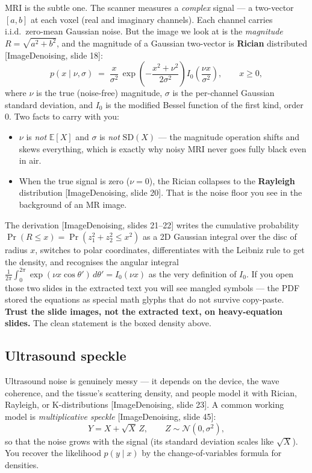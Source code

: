\documentclass[11pt]{article}
\newcommand{\E}{\mathbb{E}}
\newcommand{\deck}[1]{\textsf{\small[#1]}}
\begin{document}
MRI is the subtle one. The scanner measures a \emph{complex} signal --- a
two-vector $[a,b]$ at each voxel (real and imaginary channels). Each channel
carries i.i.d.\ zero-mean Gaussian noise. But the image we look at is the
\emph{magnitude} $R=\sqrt{a^2+b^2}$, and the magnitude of a Gaussian two-vector
is \textbf{Rician} distributed \deck{ImageDenoising, slide 18}:
\[
p(x \mid \nu,\sigma) \;=\;
   \frac{x}{\sigma^2}\,
   \exp\!\left(-\frac{x^2+\nu^2}{2\sigma^2}\right)
   I_0\!\left(\frac{\nu x}{\sigma^2}\right), \qquad x \ge 0,
\]
where $\nu$ is the true (noise-free) magnitude, $\sigma$ is the per-channel
Gaussian standard deviation, and $I_0$ is the modified Bessel function of the
first kind, order $0$. Two facts to carry with you:
\begin{itemize}[nosep,leftmargin=*]
  \item $\nu$ is \emph{not} $\E[X]$ and $\sigma$ is \emph{not} $\mathrm{SD}(X)$
  --- the magnitude operation shifts and skews everything, which is exactly why
  noisy MRI never goes fully black even in air.
  \item When the true signal is zero ($\nu=0$), the Rician collapses to the
  \textbf{Rayleigh} distribution \deck{ImageDenoising, slide 20}. That is the
  noise floor you see in the background of an MR image.
\end{itemize}

\begin{notebox}
The derivation \deck{ImageDenoising, slides 21--22} writes the cumulative
probability $\Pr(R\le x)=\Pr(z_1^2+z_2^2\le x^2)$ as a 2D Gaussian integral
over the disc of radius $x$, switches to polar coordinates, differentiates with
the Leibniz rule to get the density, and recognises the angular integral
$\frac{1}{2\pi}\int_0^{2\pi}\exp(\nu x\cos\theta')\,d\theta' = I_0(\nu x)$ as
the very definition of $I_0$. If you open those two slides in the extracted
text you will see mangled symbols --- the PDF stored the equations as special
math glyphs that do not survive copy-paste. \textbf{Trust the slide images, not
the extracted text, on heavy-equation slides.} The clean statement is the
boxed density above.
\end{notebox}

\subsection{Ultrasound speckle}

Ultrasound noise is genuinely messy --- it depends on the device, the wave
coherence, and the tissue's scattering density, and people model it with
Rician, Rayleigh, or K-distributions \deck{ImageDenoising, slide 23}. A common
working model is \emph{multiplicative speckle}
\deck{ImageDenoising, slide 45}:
\[
Y = X + \sqrt{X}\,Z, \qquad Z\sim\mathcal{N}(0,\sigma^2),
\]
so that the noise grows with the signal (its standard deviation scales like
$\sqrt{X}$). You recover the likelihood $p(y\mid x)$ by the change-of-variables
formula for densities.
\end{document}
